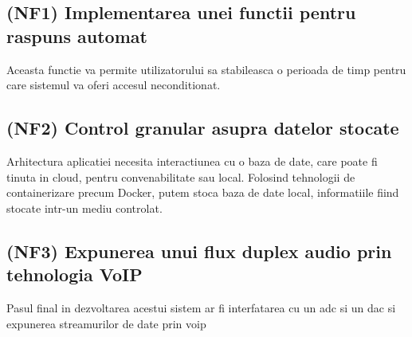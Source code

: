 \subsection{(NF1) Implementarea unei functii pentru raspuns automat}

Aceasta functie va permite utilizatorului sa stabileasca o perioada de timp pentru care sistemul va oferi accesul neconditionat.

\subsection{(NF2) Control granular asupra datelor stocate}

Arhitectura aplicatiei necesita interactiunea cu o baza de date, care poate fi tinuta in cloud, pentru convenabilitate sau local.
Folosind tehnologii de containerizare precum Docker, putem stoca baza de date local, informatiile fiind stocate intr-un mediu controlat.

\subsection{(NF3) Expunerea unui flux duplex audio prin tehnologia VoIP}

Pasul final in dezvoltarea acestui sistem ar fi interfatarea cu un \acrfull{adc} si un \acrfull{dac} si expunerea streamurilor de date prin \acrfull{voip}
